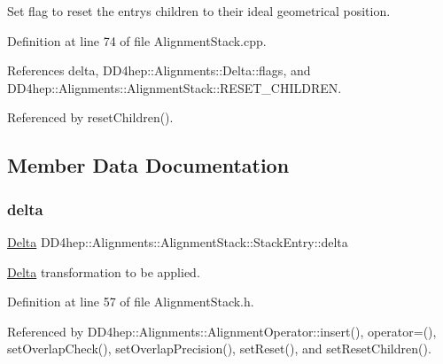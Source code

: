 Set flag to reset the entry\textquotesingle{}s children to their ideal geometrical position. 



Definition at line 74 of file Alignment\+Stack.\+cpp.



References delta, D\+D4hep\+::\+Alignments\+::\+Delta\+::flags, and D\+D4hep\+::\+Alignments\+::\+Alignment\+Stack\+::\+R\+E\+S\+E\+T\+\_\+\+C\+H\+I\+L\+D\+R\+EN.



Referenced by reset\+Children().



\subsection{Member Data Documentation}
\hypertarget{struct_d_d4hep_1_1_alignments_1_1_alignment_stack_1_1_stack_entry_a4ef9eea2ab457bd908d8050f5a5d553e}{}\label{struct_d_d4hep_1_1_alignments_1_1_alignment_stack_1_1_stack_entry_a4ef9eea2ab457bd908d8050f5a5d553e} 
\subsubsection{\texorpdfstring{delta}{delta}}
{\footnotesize\ttfamily \hyperlink{class_d_d4hep_1_1_alignments_1_1_delta}{Delta} D\+D4hep\+::\+Alignments\+::\+Alignment\+Stack\+::\+Stack\+Entry\+::delta}



\hyperlink{class_d_d4hep_1_1_alignments_1_1_delta}{Delta} transformation to be applied. 



Definition at line 57 of file Alignment\+Stack.\+h.



Referenced by D\+D4hep\+::\+Alignments\+::\+Alignment\+Operator\+::insert(), operator=(), set\+Overlap\+Check(), set\+Overlap\+Precision(), set\+Reset(), and set\+Reset\+Children().

\hypertarget{struct_d_d4hep_1_1_alignments_1_1_alignment_stack_1_1_stack_entry_aa74274273fd1aad6e46c77e9983b8e5c}{}\label{struct_d_d4hep_1_1_alignments_1_1_alignment_stack_1_1_stack_entry_aa74274273fd1aad6e46c77e9983b8e5c} 
